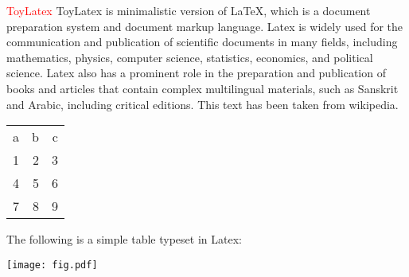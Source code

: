 \documentclass{artical}
\begin{document}
\textcolor{red}{ToyLatex}
ToyLatex
is
minimalistic
version
of
LaTeX,
which
is
a
document
preparation
system
and
document
markup
language.
Latex
is
widely
used
for
the
communication
and
publication
of
scientific
documents
in
many
fields,
including
mathematics,
physics,
computer
science,
statistics,
economics,
and
political
science.
Latex
also
has
a
prominent
role
in
the
preparation
and
publication
of
books
and
articles
that
contain
complex
multilingual
materials,
such
as
Sanskrit
and
Arabic,
including
critical
editions.
This
text
has
been
taken
from
wikipedia.
\begin{center}
\begin{tabular}{rrr}
\hline
a & b & c\\
1 & 2 & 3\\
4 & 5 & 6\\
7 & 8 & 9\\
\end{tabular}
\end{center}
The
following
is
a
simple
table
typeset
in
Latex:
\begin{center}
\texttt{[image: fig.pdf]}
\end{center}
\end{document}
